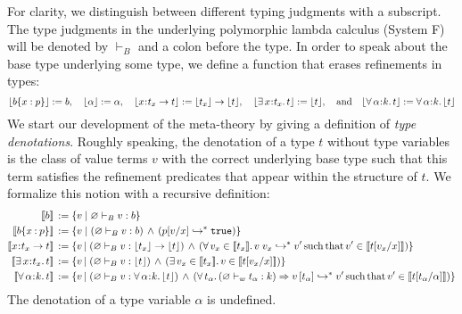 \documentclass[11pt]{article}
\newcommand{\al}{\alpha}
\newcommand{\bind}{\hspace{0.05em}{:}\hspace{0.05em}} %
\newcommand{\col}{\mathbin{:}}       %
\newcommand{\lb}{\llbracket}         %
\newcommand{\rb}{\rrbracket}         %
\newcommand{\many}{\hookrightarrow^*}
\newcommand{\polytype}[3]{\forall\, #1\bind #2.\, #3}
\begin{document}
For clarity, we distinguish between different typing judgments with a subscript.  The type judgments in the underlying polymorphic lambda calculus (System F) will be denoted by $\vdash_B$ and a colon before the type. In order to speak about the base type underlying some type, we define a function that erases refinements in types:
\[
\lfloor b\{x:p\} \rfloor := b, \quad \lfloor \al \rfloor := \al, \quad
\lfloor x\bind t_x \rightarrow t\rfloor := \lfloor t_x \rfloor \rightarrow \lfloor t \rfloor, \quad
\lfloor \exists\, x\bind t_x.\, t\rfloor := \lfloor t\rfloor,
\quad{\rm and}\quad
\lfloor \polytype{\al}{k}{t} \rfloor := \polytype{\al}{k}{\lfloor t\rfloor}
\]
We start our development of the meta-theory by giving a definition of {\em type denotations}. Roughly speaking, the denotation of a type $t$ without type variables is the class of value terms $v$ with the correct underlying base type such that this term satisfies the refinement predicates that appear within the structure of $t$. We formalize this notion with a recursive definition:
\begin{align*}
\lb b \rb \,&:= \{ v \;|\; \varnothing \vdash_B v : b\}\\
\lb b\{x\col p\}\rb \,&:= 
  \{ v \;|\; (\varnothing \vdash_B v:b)
\,\wedge\, (%
p[v/x] \many {\tt true})\} \\
\lb x\bind t_x \rightarrow t\rb \,&:= 
\{ v\,|\; (\varnothing \vdash_B v : \lfloor t_x\rfloor \rightarrow \lfloor t\rfloor ) \,\wedge\,
( \forall\, v_x \in \lb t_x \rb.\, v\; v_x \many v' \,{\rm such\, that}\, v' \in \lb t[v_x/x] \rb)\} 
\\
\lb \exists\, x\bind t_x .\, t\rb \,&:= 
\{ v \,|\; (\varnothing \vdash_B v : \lfloor t\rfloor ) \,\wedge\,
( \exists\, v_x \in \lb t_x \rb.\, v\in \lb t[v_x/x] \rb)\}
\\
\lb\polytype{\al}{k}{t}\rb \,&:= \{ v \,|\; 
( \varnothing \vdash_B v : \polytype{\al}{k}{\lfloor t \rfloor}) \,\wedge\,
( \forall\, t_\al.\, (\varnothing \vdash_w t_\al : k) \Rightarrow 
v\, [t_\al] \many v' \,{\rm such\, that}\, v' \in \lb t [t_\al/\al] \rb)
\}
\end{align*}
The denotation of a type variable $\al$ is undefined.
\end{document}
